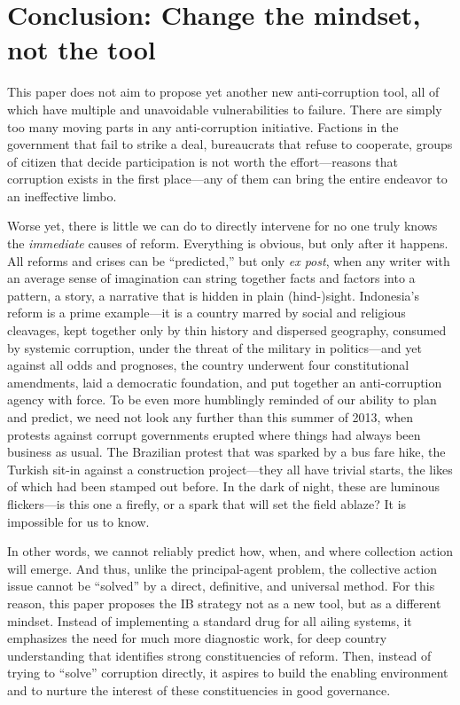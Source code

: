 \documentclass[12pt]{article}
\begin{document}
\section{Conclusion: Change the mindset, not the tool} \label{sec:conclusion}

This paper does not aim to propose yet another new anti-corruption tool, all of which have multiple and unavoidable vulnerabilities to failure. There are simply too many moving parts in any anti-corruption initiative. Factions in the government that fail to strike a deal, bureaucrats that refuse to cooperate, groups of citizen that decide participation is not worth the effort---reasons that corruption exists in the first place---any of them can bring the entire endeavor to an ineffective limbo.

Worse yet, there is little we can do to directly intervene for no one truly knows the \textit{immediate} causes of reform. Everything is obvious, but only after it happens. All reforms and crises can be ``predicted,'' but only \textit{ex post}, when any writer with an average sense of imagination can string together facts and factors into a pattern, a story, a narrative that is hidden in plain (hind-)sight. Indonesia's reform is a prime example---it is a country marred by social and religious cleavages, kept together only by thin history and dispersed geography, consumed by systemic corruption, under the threat of the military in politics---and yet against all odds and prognoses, the country underwent four constitutional amendments, laid a democratic foundation, and put together an anti-corruption agency with force. To be even more humblingly reminded of our ability to plan and predict, we need not look any further than this summer of 2013, when protests against corrupt governments erupted where things had always been business as usual. The Brazilian protest that was sparked by a bus fare hike, the Turkish sit-in against a construction project---they all have trivial starts, the likes of which had been stamped out before. In the dark of night, these are luminous flickers---is this one a firefly, or a spark that will set the field ablaze? It is impossible for us to know.

In other words, we cannot reliably predict how, when, and where collection action will emerge. And thus, unlike the principal-agent problem, the collective action issue cannot be ``solved'' by a direct, definitive, and universal method. For this reason, this paper proposes the IB strategy not as a new tool, but as a different mindset. Instead of implementing a standard drug for all ailing systems, it emphasizes the need for much more diagnostic work, for deep country understanding that identifies strong constituencies of reform. Then, instead of trying to ``solve'' corruption directly, it aspires to build the enabling environment and to nurture the interest of these constituencies in good governance.
\end{document}
